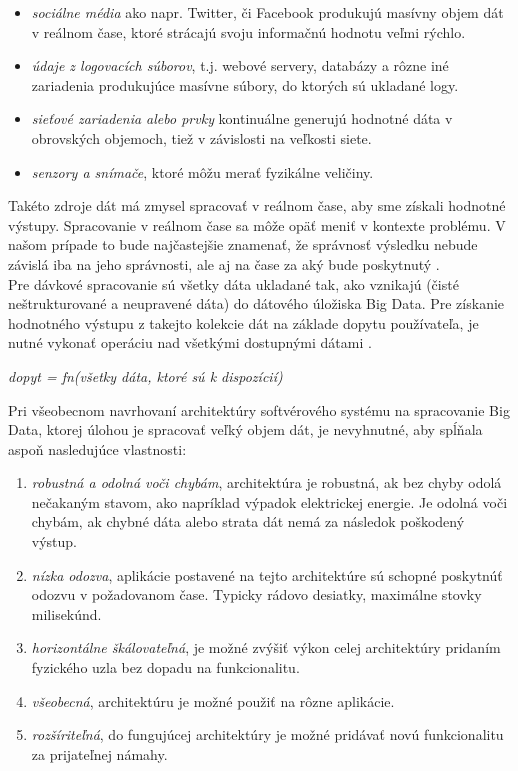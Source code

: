 \begin{itemize}
    \item \textit{sociálne média} ako napr. Twitter, či Facebook produkujú masívny objem dát v reálnom čase, ktoré strácajú svoju informačnú hodnotu veľmi rýchlo.
    \item \textit{údaje z logovacích súborov}, t.j. webové servery, databázy a rôzne iné zariadenia produkujúce masívne súbory, do ktorých sú ukladané logy.
    \item \textit{sieťové zariadenia alebo prvky} kontinuálne generujú hodnotné dáta v obrovských objemoch, tiež v závislosti na veľkosti siete.
    \item \textit{senzory a snímače}, ktoré môžu merať fyzikálne veličiny.
\end{itemize} 
Takéto zdroje dát má zmysel spracovať v reálnom čase, aby sme získali hodnotné výstupy. Spracovanie v reálnom čase sa môže opäť meniť v kontexte problému. V našom prípade to bude najčastejšie znamenať, že správnosť výsledku nebude závislá iba na jeho správnosti, ale aj na čase za aký bude poskytnutý \citep{stankovic1999misconceptions}. 
\\[5pt]
Pre dávkové spracovanie sú všetky dáta ukladané tak, ako vznikajú (čisté neštrukturované a neupravené dáta) do dátového úložiska Big Data. Pre získanie hodnotného výstupu z takejto kolekcie dát na základe dopytu používateľa, je nutné vykonať operáciu nad všetkými dostupnými dátami \citep[s. 8-10]{marz2013big}.
\begin{center}
\textit{dopyt = fn(všetky dáta, ktoré sú k dispozícií)}
\end{center}

Pri všeobecnom navrhovaní architektúry softvérového systému na spracovanie Big Data, ktorej úlohou je spracovať veľký objem dát, je nevyhnutné, aby spĺňala aspoň nasledujúce vlastnosti:
\begin{enumerate}
    \item \textit{robustná a odolná voči chybám}, architektúra je robustná, ak bez chyby odolá nečakaným stavom, ako napríklad výpadok elektrickej energie. Je odolná voči chybám, ak chybné dáta alebo strata dát nemá za následok poškodený výstup.
    \item \textit{nízka odozva}, aplikácie postavené na tejto architektúre sú schopné poskytnúť odozvu v požadovanom čase. Typicky rádovo desiatky, maximálne stovky milisekúnd.
    \item \textit{horizontálne škálovateľná}, je možné zvýšiť výkon celej architektúry pridaním fyzického uzla bez dopadu na funkcionalitu.
    \item \textit{všeobecná}, architektúru je možné použiť na rôzne aplikácie.
    \item \textit{rozšíriteľná}, do fungujúcej architektúry je možné pridávať novú funkcionalitu za prijateľnej námahy.
\end{enumerate}




